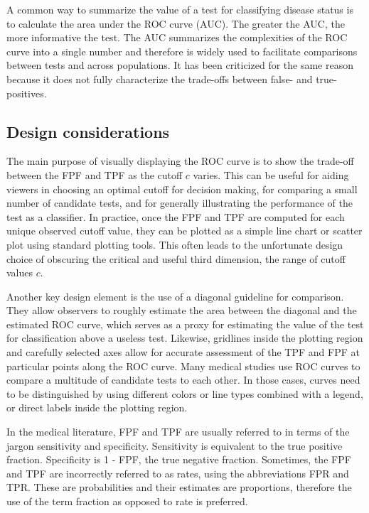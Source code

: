 \documentclass[codesnippet]{jss}
\begin{document}
A common way to summarize the value of a test for classifying disease
status is to calculate the area under the ROC curve (AUC). The greater
the AUC, the more informative the test. The AUC summarizes the
complexities of the ROC curve into a single number and therefore is
widely used to facilitate comparisons between tests and across
populations. It has been criticized for the same reason because it does
not fully characterize the trade-offs between false- and true-positives.

\subsection{Design considerations}\label{design-considerations}

The main purpose of visually displaying the ROC curve is to show the
trade-off between the FPF and TPF as the cutoff \(c\) varies. This can
be useful for aiding viewers in choosing an optimal cutoff for decision
making, for comparing a small number of candidate tests, and for
generally illustrating the performance of the test as a classifier. In
practice, once the FPF and TPF are computed for each unique observed
cutoff value, they can be plotted as a simple line chart or scatter plot
using standard plotting tools. This often leads to the unfortunate
design choice of obscuring the critical and useful third dimension, the
range of cutoff values \(c\).

Another key design element is the use of a diagonal guideline for
comparison. They allow observers to roughly estimate the area between
the diagonal and the estimated ROC curve, which serves as a proxy for
estimating the value of the test for classification above a useless
test. Likewise, gridlines inside the plotting region and carefully
selected axes allow for accurate assessment of the TPF and FPF at
particular points along the ROC curve. Many medical studies use ROC
curves to compare a multitude of candidate tests to each other. In those
cases, curves need to be distinguished by using different colors or line
types combined with a legend, or direct labels inside the plotting
region.

In the medical literature, FPF and TPF are usually referred to in terms
of the jargon sensitivity and specificity. Sensitivity is equivalent to
the true positive fraction. Specificity is 1 - FPF, the true negative
fraction. Sometimes, the FPF and TPF are incorrectly referred to as
rates, using the abbreviations FPR and TPR. These are probabilities and
their estimates are proportions, therefore the use of the term fraction
as opposed to rate is preferred.
\end{document}
